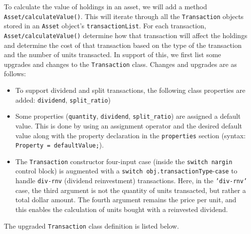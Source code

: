 To calculate the value of holdings in an asset, we will add a method \texttt{Asset/calculateValue()}. This will iterate through all the \texttt{Transaction} objects stored in an \texttt{Asset} object's \texttt{transactionList}. For each transaction, \texttt{Asset/calculateValue()} determine how that transaction will affect the holdings and determine the cost of that transaction based on the type of the transaction and the number of units transacted. In support of this, we first list some upgrades and changes to the \texttt{Transaction} class. Changes and upgrades are as follows:
\begin{itemize}
\item To support dividend and split transactions, the following class properties are added: \texttt{dividend}, \texttt{split\_ratio})
\item Some properties (\texttt{quantity}, \texttt{dividend}, \texttt{split\_ratio}) are assigned a default value. This is done by using an assignment operator and the desired default value along with the property declaration in the \texttt{properties} section (syntax: \texttt{Property = defaultValue;}).
\item The \texttt{Transaction} constructor four-input case (inside the \texttt{switch nargin} control block) is augmented with a \texttt{switch obj.transactionType}-\texttt{case} to handle \texttt{div-rnv} (dividend reinvestment) transactions. Here, in the \texttt{'div-rnv'} case, the third argument is not the quantity of units transacted, but rather a total dollar amount. The fourth argument remains the price per unit, and this enables the calculation of units bought with a reinvested dividend.
\end{itemize}
The upgraded \texttt{Transaction} class definition is listed below.
